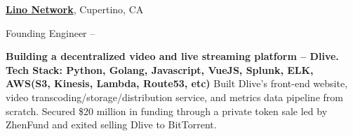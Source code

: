 \documentclass[a4paper,MMMyyyy,nonstopmode]{simpleresumecv}
\begin{document}
\begin{Body}
\BigGap
\Entry
\href{https://lino.network/}
{\textbf{Lino Network}},
Cupertino, CA

\Gap
\BulletItem
Founding Engineer
\hfill
{} --

\begin{Detail}
\SubBulletItem \textbf{Building a decentralized video and live streaming platform -- Dlive.}
\SubBulletItem \textbf{Tech Stack: Python, Golang, Javascript, VueJS, Splunk, ELK, AWS(S3, Kinesis, Lambda, Route53, etc)}
\SubBulletItem 
Built Dlive's front-end website, video transcoding/storage/distribution service, and metrics data pipeline from scratch.
\SubBulletItem
Secured \$20 million in funding through a private token sale led by ZhenFund and exited selling Dlive to BitTorrent.
\end{Detail}







\end{Body}
\end{document}

